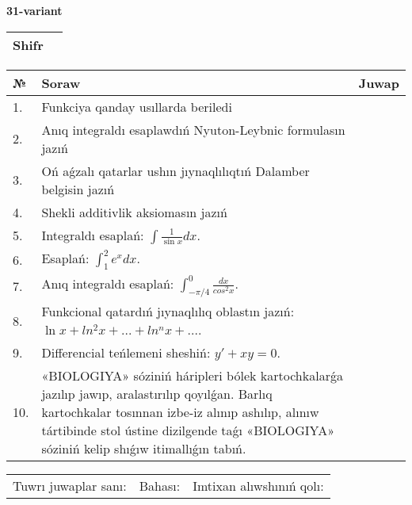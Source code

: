 \documentclass{article}
\begin{document}
  \egroup
  
  \newpage
  
  
  \textbf{31-variant}\\
  
  \bgroup
  \def\arraystretch{1.6} %
  
  \begin{tabular}{|m{5.7cm}|m{9.5cm}|}
  \hline
  Shifr & \\
  \hline
  \end{tabular}
  
  \vspace{1cm}
  
  \begin{tabular}{|m{0.7cm}|m{10cm}|m{4cm}|}
  \hline
  № & Soraw & Juwap \\
  \hline
  1. & Funkciya qanday usıllarda beriledi &  \\
  \hline
  2. & Anıq integraldı esaplawdıń Nyuton-Leybnic formulasın jazıń &  \\
  \hline
  3. & Oń aǵzalı qatarlar ushın jıynaqlılıqtıń Dalamber belgisin jazıń &  \\
  \hline
  4. & Shekli additivlik aksiomasın jazıń &  \\
  \hline
  5. & Integraldı esaplań: \(\int{\frac{1}{\sin x}dx}\). &  \\
  \hline
  6. & Esaplań: \(\int_{1}^2 {e^{x}dx}\). &  \\
  \hline
  7. & Anıq integraldı esaplań: \(\int_{- \pi/4}^{0}\frac{dx}{cos^2 x}\). &  \\
  \hline
  8. & Funkcional qatardıń jıynaqlılıq oblastın jazıń: \(\ln x + ln^2 x + ... + ln^{n}x + ...\). &  \\
  \hline
  9. & Differencial teńlemeni sheshiń: \(y' + xy = 0\). &  \\
  \hline
  10. & «BIOLOGIYA» sóziniń háripleri bólek kartochkalarǵa jazılıp jawıp, aralastırılıp qoyılǵan. Barlıq kartochkalar tosınnan izbe-iz alınıp ashılıp, alınıw tártibinde stol ústine dizilgende taǵı «BIOLOGIYA» sóziniń kelip shıǵıw itimallıǵın tabıń. &  \\
  \hline
  \end{tabular}
  
  \vspace{1cm}
  
  \begin{tabular}{lll}
  Tuwrı juwaplar sanı: \underline{\hspace{1.5cm}} & 
  Bahası: \underline{\hspace{1.5cm}} & 
  Imtixan alıwshınıń qolı: \underline{\hspace{2cm}} \\
  \end{tabular}
  
\end{document}
